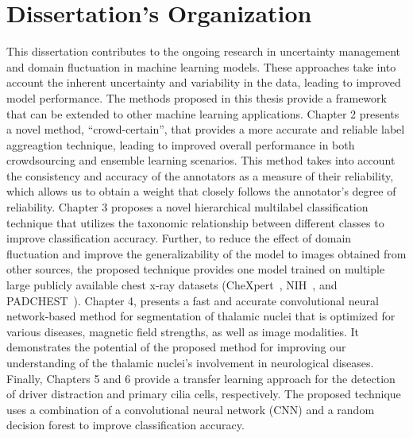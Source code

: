 \section{Dissertation's Organization}
This dissertation contributes to the ongoing research in uncertainty management and domain fluctuation in machine learning models. These approaches take into account the inherent uncertainty and variability in the data, leading to improved model performance. The methods proposed in this thesis provide a framework that can be extended to other machine learning applications. Chapter 2 presents a novel method, ``crowd-certain'', that provides a more accurate and reliable label aggreagtion technique, leading to improved overall performance in both crowdsourcing and ensemble learning scenarios. This method takes into account the consistency and accuracy of the annotators as a measure of their reliability, which allows us to obtain a weight that closely follows the annotator's degree of reliability. Chapter 3 proposes a novel hierarchical multilabel classification technique that utilizes the taxonomic relationship between different classes to improve classification accuracy. Further, to reduce the effect of domain fluctuation and improve the generalizability of the model to images obtained from other sources, the proposed technique provides one model trained on multiple large publicly available chest x-ray datasets (CheXpert~\cite{irvin_CheXpert_2019}, NIH~\cite{wang_ChestXRay8_2017}, and PADCHEST~\cite{bustos_Padchest_2020}). Chapter 4, presents a fast and accurate convolutional neural network-based method for segmentation of thalamic nuclei that is optimized for various diseases, magnetic field strengths, as well as image modalities. It demonstrates the potential of the proposed method for improving our understanding of the thalamic nuclei's involvement in neurological diseases. Finally, Chapters 5 and 6 provide a transfer learning approach for the detection of driver distraction and primary cilia cells, respectively. The proposed technique uses a combination of a convolutional neural network (CNN) and a random decision forest to improve classification accuracy.
